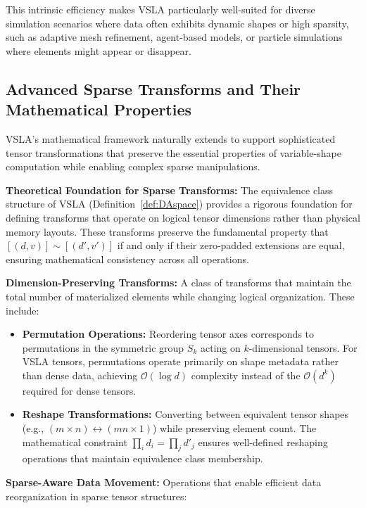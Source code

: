 \documentclass[11pt]{article}
\begin{document}
This intrinsic efficiency makes VSLA particularly well-suited for diverse simulation scenarios where data often exhibits dynamic shapes or high sparsity, such as adaptive mesh refinement, agent-based models, or particle simulations where elements might appear or disappear.

\subsection{Advanced Sparse Transforms and Their Mathematical Properties}

VSLA's mathematical framework naturally extends to support sophisticated tensor transformations that preserve the essential properties of variable-shape computation while enabling complex sparse manipulations.

\textbf{Theoretical Foundation for Sparse Transforms:} The equivalence class structure of VSLA (Definition~\ref{def:DAspace}) provides a rigorous foundation for defining transforms that operate on logical tensor dimensions rather than physical memory layouts. These transforms preserve the fundamental property that $[(d,v)] \sim [(d',v')]$ if and only if their zero-padded extensions are equal, ensuring mathematical consistency across all operations.

\textbf{Dimension-Preserving Transforms:} A class of transforms that maintain the total number of materialized elements while changing logical organization. These include:

\begin{itemize}
\item \textbf{Permutation Operations:} Reordering tensor axes corresponds to permutations in the symmetric group $S_k$ acting on $k$-dimensional tensors. For VSLA tensors, permutations operate primarily on shape metadata rather than dense data, achieving $\mathcal{O}(\log d)$ complexity instead of the $\mathcal{O}(d^k)$ required for dense tensors.

\item \textbf{Reshape Transformations:} Converting between equivalent tensor shapes (e.g., $(m \times n) \leftrightarrow (mn \times 1)$) while preserving element count. The mathematical constraint $\prod_i d_i = \prod_j d'_j$ ensures well-defined reshaping operations that maintain equivalence class membership.
\end{itemize}

\textbf{Sparse-Aware Data Movement:} Operations that enable efficient data reorganization in sparse tensor structures:
\end{document}
